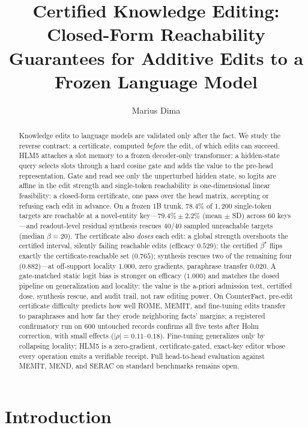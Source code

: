 \documentclass[11pt]{article}
\title{\textbf{Certified Knowledge Editing: Closed-Form Reachability\\
 Guarantees for Additive Edits to a Frozen Language Model}}
\author[1]{Marius Dima}
\affil[1]{Qriton \quad \texttt{marius.dima@qriton.com}}
\date{}
\theoremstyle{remark}
\begin{document}
\maketitle

\begin{abstract}
Knowledge edits to language models are validated only after the fact. We study
the reverse contract: a certificate, computed \emph{before} the edit, of which
edits can succeed. HLM5 attaches a slot memory to a frozen decoder-only
transformer: a hidden-state query selects slots through a hard cosine gate and
adds the value to the pre-head representation. Gate and read see only the
unperturbed hidden state, so logits are affine in the edit strength and
single-token reachability is one-dimensional linear feasibility: a closed-form
certificate, one pass over the head matrix, accepting or refusing each edit in
advance. On a frozen $1$B trunk, $78.4\%$ of $1{,}200$ single-token targets
are reachable at a novel-entity key---$79.4\%\pm2.2\%$ (mean $\pm$ SD) across
$60$ keys---and readout-level residual synthesis rescues $40/40$ sampled
unreachable targets (median $\beta=20$). The certificate also \emph{doses}
each edit: a global strength overshoots the certified interval, silently
failing reachable edits (efficacy $0.529$); the certified $\beta^{\star}$
flips exactly the certificate-reachable set ($0.765$); synthesis rescues two
of the remaining four ($0.882$)---at off-support locality $1.000$, zero
gradients, paraphrase transfer $0.020$. A gate-matched static logit bias is
stronger on efficacy ($1.000$) and matches the dosed pipeline on generalization
and locality: the value is the a-priori admission test, certified dose,
synthesis rescue, and audit trail, not raw editing power. On CounterFact,
pre-edit certificate difficulty predicts how well ROME, MEMIT, and fine-tuning
edits transfer to paraphrases and how far they erode neighboring facts'
margins; a registered confirmatory run on $600$ untouched records confirms all
five tests after Holm correction, with small effects ($|\rho|=0.11$--$0.18$).
Fine-tuning generalizes
only by collapsing locality; HLM5 is a zero-gradient, certificate-gated,
exact-key editor whose every operation emits a verifiable receipt. Full
head-to-head evaluation against MEMIT, MEND, and SERAC on standard benchmarks
remains open.
\end{abstract}

\section{Introduction}
\end{document}
